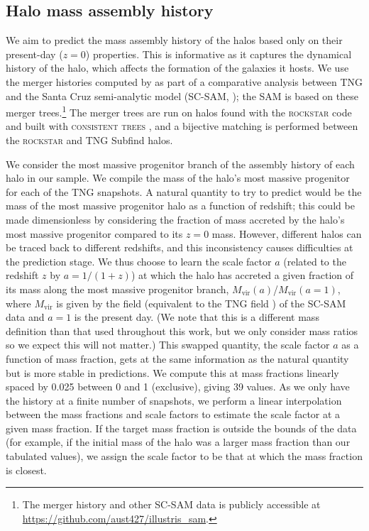 \subsection{Halo mass assembly history}
\label{sec:mah}

We aim to predict the mass assembly history of the \dark halos based only on their present-day ($z=0$) properties.
This is informative as it captures the dynamical history of the halo, which affects the formation of the galaxies it hosts.
We use the merger histories computed by \citep{gabrielpillai_galaxy_2021} as part of a comparative analysis between TNG and the Santa Cruz semi-analytic model (SC-SAM, \citealt{somerville_semi-analytic_1999,somerville_semi-analytic_2008, somerville_star_2015}); the SAM is based on these merger trees.\footnote{The merger history and other SC-SAM data is publicly accessible at \url{https://github.com/aust427/illustris_sam}.}
The merger trees are run on halos found with the \textsc{rockstar} \citep{behroozi_rockstar_2013} code and built with \textsc{consistent trees} \citep{behroozi_gravitationally_2012}, and a bijective matching is performed between the \textsc{rockstar} and TNG Subfind halos.

We consider the most massive progenitor branch of the assembly history of each \dark halo in our sample.
We compile the mass of the halo's most massive progenitor for each of the TNG snapshots. 
A natural quantity to try to predict would be the mass of the most massive progenitor halo as a function of redshift; this could be made dimensionless  by considering the fraction of mass accreted by the halo's most massive progenitor compared to its $z=0$ mass.
However, different halos can be traced back to different redshifts, and this inconsistency causes difficulties at the prediction stage.
We thus choose to learn the scale factor $a$ (related to the redshift $z$ by $a=1/(1+z)$) at which the halo has accreted a given fraction of its mass along the most massive progenitor branch, $M_\mathrm{vir}(a)$/$M_\mathrm{vir}(a=1)$, where $M_\mathrm{vir}$ is given by the  field (equivalent to the TNG field ) of the SC-SAM data and $a=1$ is the present day.
(We note that this is a different mass definition than that used throughout this work, but we only consider mass ratios so we expect this will not matter.)
This swapped quantity, the scale factor $a$ as a function of mass fraction, gets at the same information as the natural quantity but is more stable in predictions.
We compute this at mass fractions linearly spaced by 0.025 between 0 and 1 (exclusive), giving 39 values. 
As we only have the history at a finite number of snapshots, we perform a linear interpolation between the mass fractions and scale factors to estimate the scale factor at a given mass fraction.
If the target mass fraction is outside the bounds of the data (for example, if the initial mass of the halo was a larger mass fraction than our tabulated values), we assign the scale factor to be that at which the mass fraction is closest.



